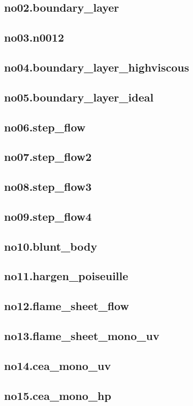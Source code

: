 \documentclass{jsarticle}
\begin{document}
\subsection{no02.boundary\_layer}
\subsection{no03.n0012}
\subsection{no04.boundary\_layer\_highviscous}
\subsection{no05.boundary\_layer\_ideal}
\subsection{no06.step\_flow}
\subsection{no07.step\_flow2}
\subsection{no08.step\_flow3}
\subsection{no09.step\_flow4}
\subsection{no10.blunt\_body}
\subsection{no11.hargen\_poiseuille}
\subsection{no12.flame\_sheet\_flow}
\subsection{no13.flame\_sheet\_mono\_uv}
\subsection{no14.cea\_mono\_uv}
\subsection{no15.cea\_mono\_hp}
\end{document}
